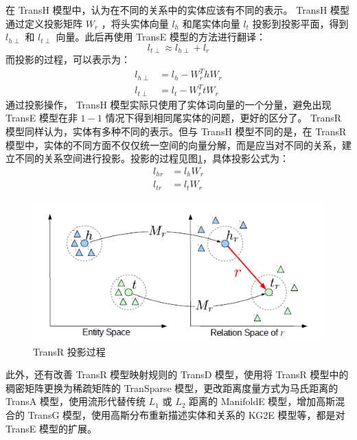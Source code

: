 \documentclass{llncs}
\begin{document}
在 TransH 模型中，认为在不同的关系中的实体应该有不同的表示。 TransH 模型通过定义投影矩阵 $W_r$ ，将头实体向量 $l_h$ 和尾实体向量 $l_t$ 投影到投影平面，得到 $l_{h\perp}$ 和 $l_{t\perp}$ 向量。此后再使用 TransE 模型的方法进行翻译：
\begin{displaymath}
l_{t\perp}\approx l_{h\perp}+l_r
\end{displaymath}
而投影的过程，可以表示为：
\begin{displaymath}
	\begin{split}{}
	l_{h\perp}&=l_h-W_r^ThW_r \\
	l_{t\perp}&=l_t-W_r^TtW_r
	\end{split}
\end{displaymath}
通过投影操作， TransH 模型实际只使用了实体词向量的一个分量，避免出现 TransE 模型在非 $1-1$ 情况下得到相同尾实体的问题，更好的区分了。 TransR 模型\cite{DBLP:conf/aaai/LinLSLZ15}同样认为，实体有多种不同的表示。但与 TransH 模型不同的是，在 TransR 模型中，实体的不同方面不仅仅统一空间的向量分解，而是应当对不同的关系，建立不同的关系空间进行投影。投影的过程见图\ref{fg:TransR}，具体投影公式为：
\begin{displaymath}
	\begin{split}
	l_{hr}&=l_hW_r \\
	l_{tr}&=l_tW_r
	\end{split}
\end{displaymath}

\begin{figure}
	\centering
	\includegraphics[width=0.5\columnwidth]{figures/TransR.png}
	\caption{ TransR 投影过程}
	\label{fg:TransR}
\end{figure}

此外，还有改善 TransR 模型映射规则的 TransD 模型\cite{DBLP:conf/er/XiongHD18}，使用将 TransR 模型中的稠密矩阵更换为稀疏矩阵的 TranSparse 模型\cite{DBLP:conf/aaai/JiLH016}，更改距离度量方式为马氏距离的 TransA 模型\cite{DBLP:journals/corr/0005HHZ15a}，使用流形代替传统 $L_1$ 或 $L_2$ 距离的 ManifoldE 模型\cite{DBLP:conf/ijcai/0005HZ16}，增加高斯混合的 TransG 模型\cite{DBLP:journals/corr/0005HHZ15}，使用高斯分布重新描述实体和关系的 KG2E 模型\cite{DBLP:conf/cikm/HeLJ015}等，都是对 TransE 模型的扩展。
\end{document}
